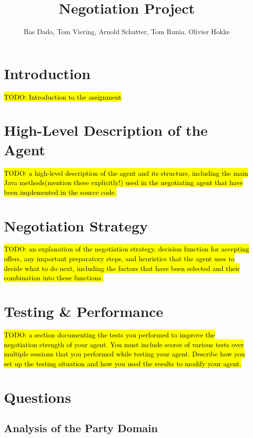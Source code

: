 \documentclass{article}
\newcommand{\todo}[1] {\hl{TODO: #1}}
\begin{document}
\title{Negotiation Project}
\author{Bas Dado, Tom Viering, Arnold Schutter, Tom Runia, Olivier Hokke}

\maketitle

\section{Introduction}

\todo{Introduction to the assignment}

\section{High-Level Description of the Agent}

\todo{a high-level description of the agent and its structure, including the main Java methods(mention these explicitly!) used in the negotiating agent that have been implemented in the source code.}

\section{Negotiation Strategy}

\todo{an explanation of the negotiation strategy, decision function for accepting offers, any important preparatory steps, and heuristics that the agent uses to decide what to do next, including the factors that have been selected and their combination into these functions.}

\section{Testing \& Performance}

\todo{a section documenting the tests you performed to improve the negotiation strength of your agent. You must include scores of various tests over multiple sessions that you performed while testing your agent. Describe how you set up the testing situation and how you used the results to modify your agent.}

\section{Questions}

\subsection{Analysis of the Party Domain}
\end{document}
